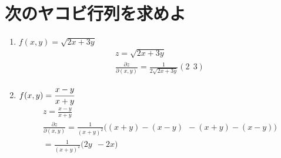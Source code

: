 \documentclass[a4paper,10pt]{jarticle}
\begin{document}
\section{次のヤコビ行列を求めよ}
\begin{enumerate}
\item$f(x,y) = \sqrt{2x+3y}$ \begin{gather*}
	z = \sqrt{2x+3y} \\
	\frac{\partial z}{\partial(x,y)} = \frac{1}{2\sqrt{2x+3y}}(2 \ \ 3)
\end{gather*}
\item $f(x,y) = \cfrac{x-y}{x+y}$ \begin{gather*}
	z = \frac{x-y}{x+y}\\
	\frac{\partial z}{\partial(x,y)} =\frac{1}{(x+y)^2}\big( (x+y)-(x-y) \ \ -(x+y)-(x-y)\big) \\
	=\frac{1}{(x+y)^2}\big( 2y \ \ -2x\big)
\end{gather*}
\end{enumerate}

\end{document}
